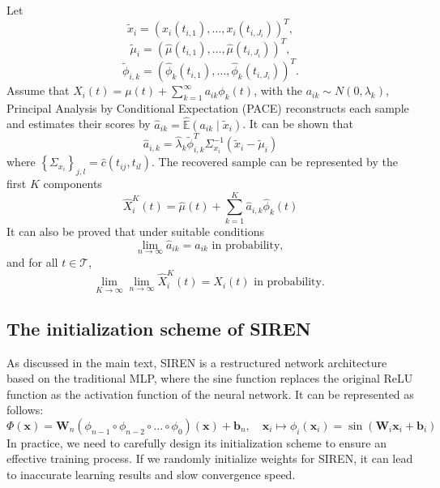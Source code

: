 \documentclass{article}
\begin{document}
Let 
$$\tilde{x}_i=\left(x_i\left(t_{i, 1}\right), \ldots, x_i\left(t_{i, J_i}\right)\right)^T, $$
$$\tilde{\mu}_i=\left(\widehat{\mu}\left(t_{i, 1}\right), \ldots, \widehat{\mu}\left(t_{i, J_i}\right)\right)^T, $$ 
$$\tilde{\phi}_{i, k}=\left(\widehat{\phi}_k\left(t_{i, 1}\right), \ldots, \widehat{\phi}_k\left(t_{i, J_i}\right)\right)^T.$$
Assume that $X_i(t)=\mu(t)+\sum_{k=1}^{\infty} a_{i k} \phi_k(t)$, with the $a_{i k} \sim N\left(0, \lambda_k\right)$,
Principal Analysis by Conditional Expectation (PACE) reconstructs each sample and estimates their scores by $\widehat{a}_{i k}=\hat{\mathbb{E}}\left(a_{i k} \mid \tilde{x}_i\right)$.
It can be shown that 
$$
\widehat{a}_{i, k}=\widehat{\lambda}_k \tilde{\phi}_{i, k}^T \Sigma_{x_i}^{-1}\left(\tilde{x}_i-\tilde{\mu}_i\right)
$$
where $\left\{\Sigma_{x_i}\right\}_{j, l}=\widehat{c}\left(t_{ij}, t_{il}\right)$.
The recovered sample can be represented by the first $K$ components 
$$\widehat{X}_i^K(t)=\widehat{\mu}(t)+\sum_{k=1}^K \widehat{a}_{i, k} \widehat{\phi}_k(t)$$
It can also be proved \cite{yao2005functional}  that under suitable conditions
$$
\lim _{n \rightarrow \infty} \hat{a}_{i k}={a}_{i k} \text { in probability, }
$$
and for all $t \in \mathcal{T}$,
$$
\lim _{K \rightarrow \infty} \lim _{n \rightarrow \infty} \widehat{X}_i^K(t)={X}_i(t) \text { in probability. }
$$


\subsection{The initialization scheme of SIREN \cite{sitzmann2020implicit}}
\label{SIREN}

As discussed in the main text, SIREN is a restructured network architecture based on the traditional MLP, 
where the sine function replaces the original ReLU function as the activation function of the neural network. 
It can be represented as follows:
$$
\Phi(\mathbf{x})=\mathbf{W}_n\left(\phi_{n-1} \circ \phi_{n-2} \circ \ldots \circ \phi_0\right)(\mathbf{x})+\mathbf{b}_n, \quad \mathbf{x}_i \mapsto \phi_i\left(\mathbf{x}_i\right)=\sin \left(\mathbf{W}_i \mathbf{x}_i+\mathbf{b}_i\right)
$$
In practice, we need to carefully design its initialization scheme to ensure an effective training process. 
If we randomly initialize weights for SIREN, it can lead to inaccurate learning results and slow convergence speed.
\end{document}
